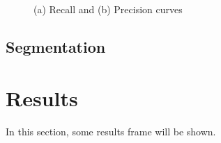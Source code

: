 \documentclass[10pt,twocolumn,letterpaper]{article}
\begin{document}
\begin{figure}
    \centering
    \caption{(a) Recall  and (b) Precision curves}
    \label{fig:foobar}
\end{figure}

\subsection{Segmentation}

\section{Results}

In this section, some results frame will be shown.
\end{document}
